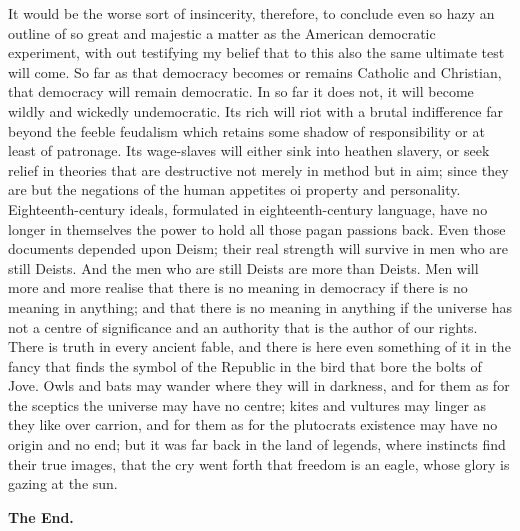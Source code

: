 \documentclass{book}
\newcommand\mdstrong[1]{\textbf{#1}}
\begin{document}
It would be the worse sort of insincerity, therefore, to conclude even so hazy an outline of so great and majestic a matter as the American democratic experiment, with out testifying my belief that to this also the same ultimate test will come. So far as that democracy becomes or remains Catholic and Christian, that democracy will remain democratic. In so far it does not, it will become wildly and wickedly undemocratic. Its rich will riot with a brutal indifference far beyond the feeble feudalism which retains some shadow of responsibility or at least of patronage. Its wage-slaves will either sink into heathen slavery, or seek relief in theories that are destructive not merely in method but in aim; since they are but the negations of the human appetites oi property and personality. Eighteenth-century ideals, formulated in eighteenth-century language, have no longer in themselves the power to hold all those pagan passions back. Even those documents depended upon Deism; their real strength will survive in men who are still Deists. And the men who are still Deists are more than Deists. Men will more and more realise that there is no meaning in democracy if there is no meaning in anything; and that there is no meaning in anything if the universe has not a centre of significance and an authority that is the author of our rights. There is truth in every ancient fable, and there is here even something of it in the fancy that finds the symbol of the Republic in the bird that bore the bolts of Jove. Owls and bats may wander where they will in darkness, and for them as for the sceptics the universe may have no centre; kites and vultures may linger as they like over carrion, and for them as for the plutocrats existence may have no origin and no end; but it was far back in the land of legends, where instincts find their true images, that the cry went forth that freedom is an eagle, whose glory is gazing at the sun.

\mdstrong{The End.}
\end{document}
